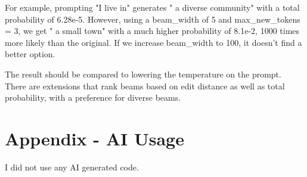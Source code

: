 \documentclass[11pt]{article}
\begin{document}
For example, prompting "I live in" generates " a diverse community" with a total probability of 6.28e-5. However, using a beam\_width of 5 and max\_new\_tokens = 3, we get " a small town" with a much higher probability of 8.1e-2, 1000 times more likely than the original. If we increase beam\_width to 100, it doesn't find a better option.

The result should be compared to lowering the temperature on the prompt. There are extensions that rank beams based on edit distance as well as total probability, with a preference for diverse beams.

\section{Appendix - AI Usage}

I did not use any AI generated code.
\end{document}

